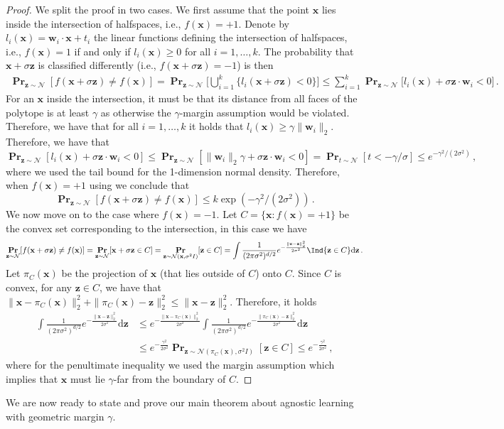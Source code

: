 \documentclass{theoretics}
\renewcommand\vec[1]{\mathbf{#1}}
\DeclareMathOperator*{\pr}{\mathbf{Pr}}
\def\d{\mathrm{d}}
\newcommand{\normal}{\mathcal{N}}
\newcommand{\1}{\Ind}
\newcommand{\x}{\vec x}
\newcommand{\z}{\vec z}
\begin{document}
\begin{proof}
We split the proof in two cases.  We first assume that the point $\x$ lies inside the intersection of halfspaces, i.e., $f(\x) = +1$.  Denote by $l_i(\x)= \vec w_i \cdot \x + t_i$ the linear functions
defining the intersection of halfspaces, i.e., $f(\x) = 1$ if and only if $l_i(\x) \geq 0$ for all $i=1,\ldots, k$.  The probability that $\x + \sigma \vec z$ is classified differently (i.e., 
$f(\x + \sigma \vec z) = -1$) is then 
\begin{align}
\pr_{\z \sim \normal}[f(\x + \sigma \z) \neq f(\x)] 
= 
\pr_{\z \sim \normal}\Big[\bigcup_{i=1}^k \{ l_i(\vec x + \sigma \vec z) < 0 \}\Big] 
\leq 
\sum_{i=1}^k  \pr_{\z \sim \normal}\Big[ l_i(\vec x) + \sigma \vec z \cdot \vec w_i < 0\Big] 
\label{eq:union-bound-inside-margin-intersection}
\,.
\end{align}
For an $\x$ inside the intersection, it must be that its distance from all faces of the polytope 
is at least $\gamma$ as otherwise the $\gamma$-margin assumption would be violated.
Therefore, we have that for all $i=1, \ldots, k$ it holds that 
$l_i(\x) \geq \gamma \|\vec w_i\|_2$.  Therefore, we have that
$ 
\pr_{\z \sim \normal}[ l_i(\vec x) + \sigma \vec z \cdot \vec w_i < 0] 
\leq 
\pr_{\z \sim \normal}[ \|\vec w_i\|_2 \gamma + \sigma \vec z \cdot \vec w_i < 0] 
=
\pr_{t \sim \normal}[ t < -\gamma/\sigma] 
\leq e^{-\gamma^2/(2 \sigma^2)}
\,,
$
where we used the tail bound for the 1-dimension normal density.
Therefore, when $f(\x) = +1$ using  we 
conclude that 
\[
\pr_{\z \sim \normal}[f(\x + \sigma \z) \neq f(\x)] 
\leq k \exp(-\gamma^2/(2\sigma^2)) \,.
\]
We now move on to the case where $f(\x) = -1$.  Let $C = \{\x : f(\x) = +1\}$ be the convex set corresponding to the intersection, in this case we have 
\[
\pr_{\z \sim \normal}[f(\x + \sigma \z) \neq f(\x)] 
=
\pr_{\z \sim \normal}[\x + \sigma \z \in C] 
=
\pr_{\z \sim \normal(\x, \sigma^2 I)}[\z \in C] 
= \int \frac{1}{(2 \pi \sigma^2)^{d/2}} e^{-\frac{\|\x - \vec z\|_2^2}{ 2 \sigma^2}}
\1\{ \vec z \in C\}
\d \vec z
\,.
\]
Let $\pi_C(\x)$ be the projection of $\x$ (that lies outside of $C$) onto $C$. 
Since $C$ is convex, for any $\vec z \in C$, we have that 
$\|\x - \pi_C(\x)\|_2^2 + \|\pi_C(\x) - \vec z\|_2^2 \leq \|\vec x - \vec z\|_2^2$.
Therefore, it holds 
\begin{align*}
 \int \frac{1}{(2 \pi \sigma^2)^{d/2}} e^{-\frac{\|\x - \vec z\|_2^2}{ 2 \sigma^2}} \d \vec z
 &\leq 
 e^{- \frac{\|\vec x - \pi_C(\x)\|_2^2}{2 \sigma^2}} 
 \int \frac{1}{(2 \pi \sigma^2)^{d/2}} e^{-\frac{\|\pi_C(\x) - \vec z\|_2^2}{ 2 \sigma^2}} \d \vec z
 \\
 &\leq
 e^{- \frac{\gamma^2}{2 \sigma^2}} 
 \pr_{\vec z \sim \normal(\pi_C(\x), \sigma^2 I)}[\vec z \in C]
 \leq 
 e^{- \frac{\gamma^2}{2 \sigma^2}} 
 \,,
\end{align*}
where for the penultimate inequality we used the margin assumption which implies that $\x$ must lie $\gamma$-far from the boundary of $C$.
\end{proof}
We are now ready to state and prove our main theorem about agnostic learning with geometric margin $\gamma$.
\end{document}

